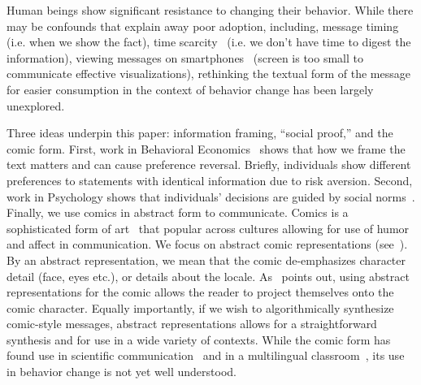 Human beings show significant resistance to changing their behavior. While there may be confounds that explain away poor adoption, including, message timing~\cite{Fogg2009} (i.e. when we show the fact), time scarcity~\cite{Janssen2016} (i.e. we don't have time to digest the information), viewing messages on smartphones~\cite{Kim2016} (screen is too small to communicate effective visualizations), rethinking the textual form of the message for easier consumption in the context of behavior change has been largely unexplored.

Three ideas underpin this paper: information framing, ``social proof,'' and the comic form. First, work in Behavioral Economics~\cite{tversky1992advances,tversky1981framing} shows that how we frame the text matters and can cause preference reversal. Briefly, individuals show different preferences to statements with identical information due to risk aversion.
 Second, work in Psychology shows that individuals' decisions are guided by social norms~\cite{goldstein2008room,schultz2007constructive}.
 Finally, we use comics in abstract form to communicate. Comics is a sophisticated form of art~\cite{scott1993understanding} that popular across cultures allowing for use of humor and affect in communication. We focus on abstract comic representations (see~). By an abstract representation, we mean that the comic de-emphasizes character detail (face, eyes etc.), or details about the locale. As~\textcite{scott1993understanding} points out, using abstract representations for the comic allows the reader to project themselves onto the comic character.
 Equally importantly, if we wish to algorithmically synthesize comic-style messages, abstract representations allows for a straightforward synthesis and for use in a wide variety of contexts.
While the comic form has found use in scientific communication~\cite{McDermottPB18} and in a multilingual classroom~\cite{cary2004going}, its use in behavior change is not yet well understood.

